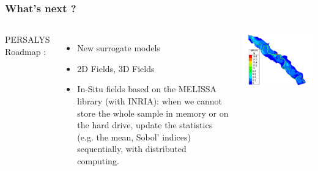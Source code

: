 \documentclass{beamer}
\begin{document}
\begin{frame}
\frametitle{What's next ?}
  \begin{columns}

PERSALYS Roadmap : 
\begin{itemize}
\item New surrogate models
\item 2D Fields, 3D Fields
\item In-Situ fields based on the MELISSA library (with INRIA): 
when we cannot store the whole sample in memory or on the hard drive, 
update the statistics (e.g. the mean, Sobol' indices) sequentially, 
with distributed computing. 
\end{itemize}


\begin{center}
\includegraphics[height=0.5\textheight]{figures/image034.png}
\end{center}

	\end{columns}

\end{frame}

\end{document}
